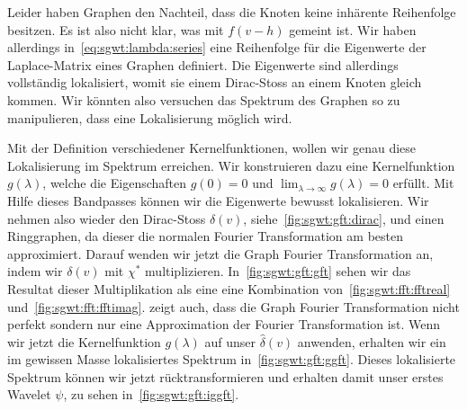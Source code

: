 Leider haben Graphen den Nachteil, dass die Knoten keine inh\"arente 
Reihenfolge besitzen. Es ist also nicht klar, was mit $f(v - h)$ gemeint ist. 
Wir haben allerdings in~\cref{eq:sgwt:lambda:series} eine Reihenfolge f\"ur die 
Eigenwerte der Laplace-Matrix eines Graphen definiert. Die Eigenwerte sind 
allerdings vollst\"andig lokalisiert, womit sie einem Dirac-Stoss an einem 
Knoten gleich kommen. Wir k\"onnten also versuchen das Spektrum des Graphen so 
zu manipulieren, dass eine Lokalisierung m\"oglich wird.

Mit der Definition verschiedener Kernelfunktionen, wollen wir genau diese 
Lokalisierung im Spektrum erreichen. Wir konstruieren dazu eine Kernelfunktion 
$g(\lambda)$, welche die Eigenschaften $g(0) = 0$ und $\lim_{\lambda\to\infty} 
g(\lambda) = 0$ erf\"ullt. Mit Hilfe dieses Bandpasses k\"onnen wir die 
Eigenwerte bewusst lokalisieren.
Wir nehmen also wieder den Dirac-Stoss $\delta(v)$, 
siehe~\cref{fig:sgwt:gft:dirac}, und einen Ringgraphen, da dieser die normalen 
Fourier Transformation am besten 
approximiert. Darauf wenden wir jetzt die Graph Fourier Transformation an, 
indem wir $\delta(v)$ mit $\chi^*$ multiplizieren.
In~\cref{fig:sgwt:gft:gft} sehen wir das Resultat dieser Multiplikation als eine
eine Kombination von~\cref{fig:sgwt:fft:fftreal} 
und~\cref{fig:sgwt:fft:fftimag}.  zeigt auch, 
dass die Graph Fourier Transformation nicht perfekt sondern nur eine 
Approximation der Fourier Transformation ist. Wenn wir jetzt die Kernelfunktion 
$g(\lambda)$ auf unser $\hat{\delta}(v)$ anwenden, erhalten wir ein im gewissen 
Masse lokalisiertes Spektrum in~\cref{fig:sgwt:gft:ggft}. Dieses lokalisierte 
Spektrum k\"onnen wir jetzt r\"ucktransformieren und erhalten damit unser 
erstes Wavelet $\psi$, zu sehen in~\cref{fig:sgwt:gft:iggft}.
